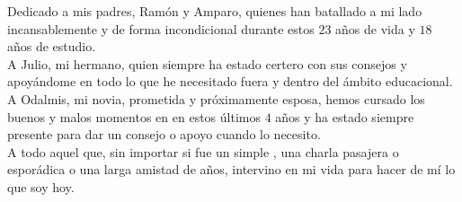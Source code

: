 
\begin{phrase}[4.2in]
	Dedicado a mis padres, Ramón y Amparo, quienes han batallado a mi lado incansablemente y de forma incondicional durante estos $23$ años de vida y $18$ años de estudio.\\
	A Julio, mi hermano, quien siempre ha estado certero con sus consejos y apoyándome en todo lo que he necesitado fuera y dentro del ámbito educacional.\\
	A Odalmis, mi novia, prometida y próximamente esposa, hemos cursado los buenos y malos momentos en en estos últimos $4$ años y ha estado siempre presente para dar un consejo o apoyo cuando lo necesito.\\
	A todo aquel que, sin importar si fue un simple , una charla pasajera o esporádica o una larga amistad de años, intervino en mi vida para hacer de mí lo que soy hoy.
\end{phrase}